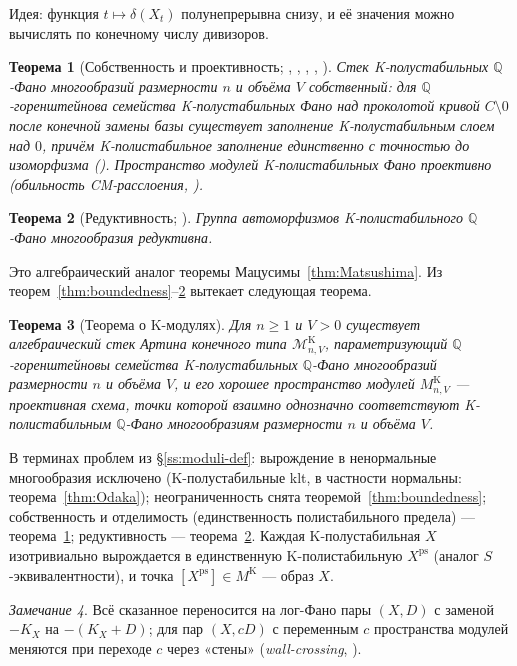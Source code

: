 \documentclass[11pt,a4paper]{article}
\theoremstyle{plain}
\newtheorem{theorem}{Теорема}[section]
\theoremstyle{definition}
\theoremstyle{remark}
\newtheorem{remark}[theorem]{Замечание}
\newcommand{\Q}{\mathbb{Q}}
\newcommand{\cM}{\mathcal{M}}
\begin{document}
Идея: функция $t\mapsto\delta(X_t)$ полунепрерывна снизу, и её значения можно вычислять по
конечному числу дивизоров.

\begin{theorem}[{Собственность и проективность; \cite{LWX}, \cite{BX}, \cite{BHLLX}, \cite{LXZ}, \cite{XZ}}]\label{thm:properness}
Стек K-полустабильных $\Q$-Фано многообразий размерности $n$ и объёма $V$ собственный: для
$\Q$-горенштейнова семейства K-полустабильных Фано над проколотой кривой $C\setminus0$ после
конечной замены базы существует заполнение K-полустабильным слоем над $0$, причём K-полистабильное
заполнение единственно с точностью до изоморфизма \textup{(}\cite{BX}\textup{)}. Пространство модулей
K-полистабильных Фано проективно \textup{(}обильность CM-расслоения, \cite{XZ}\textup{)}.
\end{theorem}

\begin{theorem}[{Редуктивность; \cite{ABHLX}}]\label{thm:reductivity}
Группа автоморфизмов K-полистабильного $\Q$-Фано многообразия редуктивна.
\end{theorem}

Это алгебраический аналог теоремы Мацусимы~\ref{thm:Matsushima}. Из
теорем~\ref{thm:boundedness}--\ref{thm:reductivity} вытекает следующая теорема.

\begin{theorem}[Теорема о K-модулях]\label{thm:Kmoduli}
Для $n\ge1$ и $V>0$ существует алгебраический стек Артина конечного типа $\cM^{\mathrm{K}}_{n,V}$,
параметризующий $\Q$-горенштейновы семейства K-полустабильных $\Q$-Фано многообразий размерности
$n$ и объёма $V$, и его хорошее пространство модулей $M^{\mathrm{K}}_{n,V}$ --- проективная схема,
точки которой взаимно однозначно соответствуют K-полистабильным $\Q$-Фано многообразиям размерности
$n$ и объёма $V$.
\end{theorem}

В терминах проблем из \S\ref{ss:moduli-def}: вырождение в ненормальные многообразия исключено
(K-полустабильные klt, в частности нормальны: теорема~\ref{thm:Odaka}); неограниченность снята
теоремой~\ref{thm:boundedness}; собственность и отделимость (единственность полистабильного предела)
--- теорема~\ref{thm:properness}; редуктивность --- теорема~\ref{thm:reductivity}. Каждая
K-полустабильная $X$ изотривиально вырождается в единственную K-полистабильную $X^{\mathrm{ps}}$
(аналог $S$-эквивалентности), и точка $[X^{\mathrm{ps}}]\in M^{\mathrm{K}}$ --- образ $X$.

\begin{remark}
Всё сказанное переносится на лог-Фано пары $(X,D)$ с заменой $-K_X$ на $-(K_X+D)$; для пар
$(X,cD)$ с переменным $c$ пространства модулей меняются при переходе $c$ через «стены»
(\emph{wall-crossing}, \cite{ADL}).
\end{remark}
\end{document}
